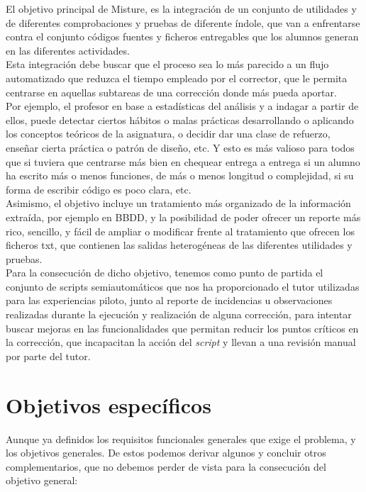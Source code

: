 El objetivo principal de Misture, es la integración de un conjunto de utilidades y de diferentes comprobaciones y pruebas de diferente índole, que van a enfrentarse contra el conjunto códigos fuentes y ficheros entregables que los alumnos generan en las diferentes actividades.\\


Esta integración debe buscar que el proceso sea lo más parecido a un flujo automatizado que reduzca el tiempo empleado por el corrector, que le permita centrarse en aquellas subtareas de una corrección donde más pueda aportar.\\


Por ejemplo, el profesor en base a estadísticas del análisis y a indagar a partir de ellos, puede detectar ciertos hábitos o malas prácticas desarrollando o aplicando los conceptos teóricos de la asignatura, o decidir dar una clase de refuerzo, enseñar cierta práctica o patrón de diseño, etc. Y esto es más valioso para todos que si tuviera que centrarse más bien en chequear entrega a entrega si un alumno ha escrito más o menos funciones, de más o menos longitud o complejidad, si su forma de escribir código es poco clara, etc.\\


Asimismo, el objetivo incluye un tratamiento más organizado de la información extraída, por ejemplo en BBDD, y la posibilidad de poder ofrecer un reporte más rico, sencillo, y fácil de ampliar o modificar frente al tratamiento que ofrecen los ficheros txt, que contienen las salidas heterogéneas de las diferentes utilidades y pruebas.\\


Para la consecución de dicho objetivo, tenemos como punto de partida el conjunto de scripts semiautomáticos que nos ha proporcionado el tutor utilizadas para las experiencias piloto, junto al reporte de incidencias u observaciones realizadas durante la ejecución y realización de alguna corrección, para intentar buscar mejoras en las funcionalidades que permitan reducir los puntos críticos en la corrección, que incapacitan la acción del \textit{script} y llevan a una revisión manual por parte del tutor. \\


\section{Objetivos específicos}
\label{sec:obj_esp}


Aunque ya definidos los requisitos funcionales generales que exige el problema, y los objetivos generales. De estos podemos derivar algunos y concluir otros complementarios, que no debemos perder de vista para la consecución del objetivo general:\\


